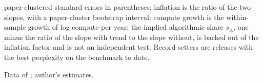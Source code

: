 \begin{table}[tp]
\begin{tablenotes}
paper-clustered standard errors in parentheses; inflation is the ratio of the two slopes, with a paper-cluster
bootstrap interval; compute growth is the within-sample growth of log compute per year; the implied algorithmic share
$s_A$, one minus the ratio of the slope with trend to the slope without, is backed out of the inflation factor and is not an
independent test. Record setters are releases with the best perplexity on the benchmark to date.\end{tablenotes}
\begin{tablenotes}[Source]Data of \citet{ho2024algorithmic}; author's estimates.\end{tablenotes}
\end{table}
